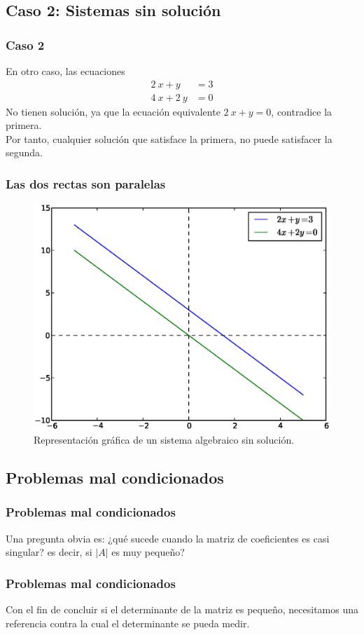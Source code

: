\subsection*{Caso 2: Sistemas sin solución}
\begin{frame}
\frametitle{Caso 2}
En otro caso, las ecuaciones
\begin{align*}
2 \: x + y &= 3 \\
4 \: x + 2 \:y &= 0
\end{align*}
No tienen solución, ya que la ecuación equivalente $2 \: x + y = 0$, contradice la primera.
\\
\bigskip
\pause
Por tanto, cualquier solución que satisface la primera, no puede satisfacer la segunda.
\end{frame}
\begin{frame}
\frametitle{Las dos rectas son paralelas}
\begin{figure}
	\centering
	\includegraphics[scale=0.4]{Imagenes/Grafica02.eps}
	\caption{Representación gráfica de un sistema algebraico sin solución.}
\end{figure}
\end{frame}
\subsection{Problemas mal condicionados}
\begin{frame}
\frametitle{Problemas mal condicionados}
Una pregunta obvia es: ¿qué sucede cuando la matriz de coeficientes es casi singular? es decir, si $\vert A \vert$ es muy pequeño?
\end{frame}
\begin{frame}
\frametitle{Problemas mal condicionados}
Con el fin de concluir si el determinante de la matriz es pequeño, necesitamos una referencia contra la cual el  determinante se pueda medir.
\end{frame}
